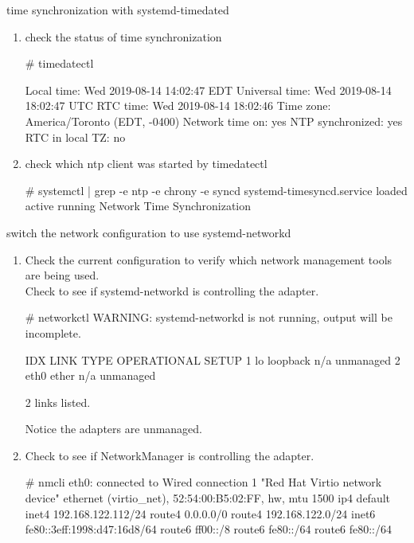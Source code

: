 \begin{Lab}
\begin{exe}{time synchronization with systemd-timedated}
\begin{enumerate}
	\item check the status of time synchronization
		\begin{raw}
# timedatectl 
		\end{raw}

		\begin{raw}
      Local time: Wed 2019-08-14 14:02:47 EDT
  Universal time: Wed 2019-08-14 18:02:47 UTC
        RTC time: Wed 2019-08-14 18:02:46
       Time zone: America/Toronto (EDT, -0400)
 Network time on: yes
NTP synchronized: yes
 RTC in local TZ: no
		\end{raw}
			
	\item check which ntp client was started by timedatectl
		\begin{raw}
# systemctl | grep -e ntp -e chrony -e syncd
systemd-timesyncd.service  loaded active running   Network Time Synchronization                                               \end{raw}

	\end{enumerate}

	\end{exe}

	\begin{exe}{switch the network configuration to use systemd-networkd}

	\begin{enumerate}
		\item
		Check the current configuration to verify which network management tools 
		are being used. \\

		Check to see if systemd-networkd is controlling the adapter.
			\begin{raw}
# networkctl 
WARNING: systemd-networkd is not running, output will be incomplete.

IDX LINK             TYPE               OPERATIONAL SETUP     
  1 lo               loopback           n/a         unmanaged 
  2 eth0             ether              n/a         unmanaged 

2 links listed.
			\end{raw}

		Notice the adapters are unmanaged.

	\item
		Check to see if NetworkManager is controlling the adapter.
			\begin{raw}
# nmcli 
eth0: connected to Wired connection 1
        "Red Hat Virtio network device"
        ethernet (virtio_net), 52:54:00:B5:02:FF, hw, mtu 1500
        ip4 default
        inet4 192.168.122.112/24
        route4 0.0.0.0/0
        route4 192.168.122.0/24
        inet6 fe80::3eff:1998:d47:16d8/64
        route6 ff00::/8
        route6 fe80::/64
        route6 fe80::/64


\end{raw}
\end{enumerate}
\end{exe}
\end{Lab}
